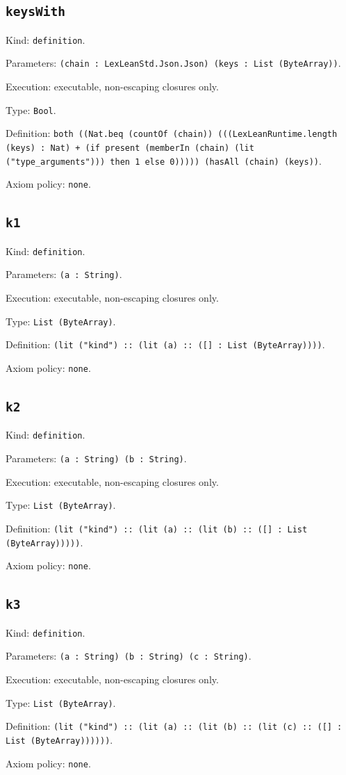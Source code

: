 \documentclass[11pt]{article}
\begin{document}
\subsection*{\texttt{keysWith}}
\noindent Kind: \texttt{definition}.\par
\noindent Parameters: \texttt{(chain : LexLeanStd.Json.Json) (keys : List (ByteArray))}.\par
\noindent Execution: executable, non-escaping closures only.\par
\noindent Type: \texttt{Bool}.\par
\noindent Definition: \texttt{both ((Nat.beq (countOf (chain)) (((LexLeanRuntime.length (keys) : Nat) + (if present (memberIn (chain) (lit ("type\_arguments"))) then 1 else 0))))) (hasAll (chain) (keys))}.\par
\noindent Axiom policy: \texttt{none}.\par
\subsection*{\texttt{k1}}
\noindent Kind: \texttt{definition}.\par
\noindent Parameters: \texttt{(a : String)}.\par
\noindent Execution: executable, non-escaping closures only.\par
\noindent Type: \texttt{List (ByteArray)}.\par
\noindent Definition: \texttt{(lit ("kind") :: (lit (a) :: ([] : List (ByteArray))))}.\par
\noindent Axiom policy: \texttt{none}.\par
\subsection*{\texttt{k2}}
\noindent Kind: \texttt{definition}.\par
\noindent Parameters: \texttt{(a : String) (b : String)}.\par
\noindent Execution: executable, non-escaping closures only.\par
\noindent Type: \texttt{List (ByteArray)}.\par
\noindent Definition: \texttt{(lit ("kind") :: (lit (a) :: (lit (b) :: ([] : List (ByteArray)))))}.\par
\noindent Axiom policy: \texttt{none}.\par
\subsection*{\texttt{k3}}
\noindent Kind: \texttt{definition}.\par
\noindent Parameters: \texttt{(a : String) (b : String) (c : String)}.\par
\noindent Execution: executable, non-escaping closures only.\par
\noindent Type: \texttt{List (ByteArray)}.\par
\noindent Definition: \texttt{(lit ("kind") :: (lit (a) :: (lit (b) :: (lit (c) :: ([] : List (ByteArray))))))}.\par
\noindent Axiom policy: \texttt{none}.\par
\end{document}
